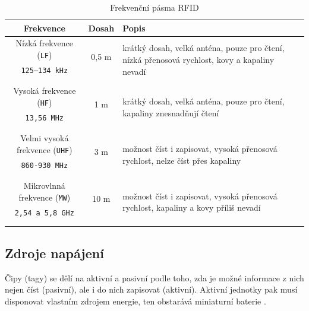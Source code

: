 \documentclass[czech,BP]{thesiskiv}
\begin{document}
\begin{table}[H]
\centering
\begin{tabular}{ c | c | p{5cm}}
 	\textbf{Frekvence} & \textbf{Dosah} & \textbf{Popis} \\ \hline\hline
    Nízká frekvence (\texttt{LF}) & \multirow{2}{*}{0,5 m} & \multirow{4}{5cm}{krátký dosah, velká anténa, pouze pro čtení, nízká přenosová rychlost, kovy a kapaliny nevadí} \\
    \texttt{125–134 kHz} &  & \\ 
    &  & \\ &  & \\ \hline
    
    Vysoká frekvence (\texttt{HF}) & \multirow{2}{*}{1 m} & \multirow{4}{5cm}{krátký dosah, velká anténa, pouze pro čtení, kapaliny znesnadňují čtení}  \\ 
	\texttt{13,56 MHz} &  & \\ 
	&  & \\ &  & \\ \hline       
	
    Velmi vysoká frekvence (\texttt{UHF}) & \multirow{2}{*}{3 m} &  \multirow{4}{5cm}{možnost číst i zapisovat, vysoká přenosová rychlost, nelze číst přes kapaliny }\\  
    \texttt{860-930 MHz} &  & \\ 
    &  & \\ &  & \\ \hline
    
    Mikrovlnná frekvence (\texttt{MW}) &  \multirow{2}{*}{10 m} & \multirow{4}{5cm}{možnost číst i zapisovat, vysoká přenosová rychlost, kapaliny a kovy příliš nevadí } \\
	\texttt{2,54 a 5,8 GHz} &  & \\ 
	&  & \\ &  & \\ \hline
\end{tabular}
\caption{Frekvenční pásma RFID}
\label{table:rfid_frekvence}
\end{table}

\newpage

\subsection{Zdroje napájení}
Čipy (tagy) se dělí na aktivní a pasivní podle toho, zda je možné informace z nich nejen číst (pasivní), ale i do nich zapisovat (aktivní). Aktivní jednotky pak musí disponovat vlastním zdrojem energie, ten obstarává miniaturní baterie \cite{dolevcek2010identifikace}.
\end{document}
